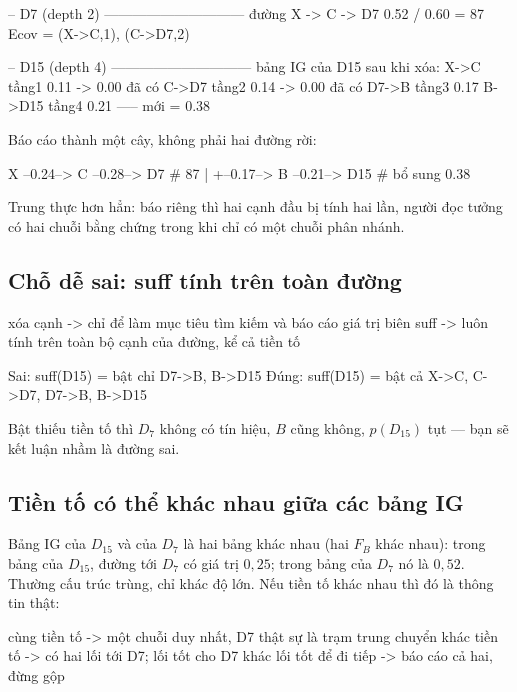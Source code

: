 \documentclass[11pt,a4paper]{article}
\begin{document}
\begin{dia}
-- D7  (depth 2) ------------------------------
đường X -> C -> D7            0.52 / 0.60 = 87%
Ecov = { (X->C,1), (C->D7,2) }

-- D15 (depth 4) ------------------------------
bảng IG của D15 sau khi xóa:
    X->C    tầng1   0.11 -> 0.00   đã có
    C->D7   tầng2   0.14 -> 0.00   đã có
    D7->B   tầng3   0.17
    B->D15  tầng4   0.21
                    ----- mới = 0.38
\end{dia}

Báo cáo thành một cây, không phải hai đường rời:

\begin{dia}
X --0.24--> C --0.28--> D7 #          87%
                        |
                        +--0.17--> B --0.21--> D15 #     bổ sung 0.38
\end{dia}

Trung thực hơn hẳn: báo riêng thì hai cạnh đầu bị tính hai lần, người đọc tưởng có hai chuỗi bằng chứng trong khi chỉ có một chuỗi phân nhánh.

\subsection{Chỗ dễ sai: suff tính trên toàn đường}

\begin{dia}
xóa cạnh  ->  chỉ để làm mục tiêu tìm kiếm và báo cáo giá trị biên
suff      ->  luôn tính trên toàn bộ cạnh của đường, kể cả tiền tố

Sai:   suff(D15) = bật chỉ { D7->B, B->D15 }
Đúng:  suff(D15) = bật cả  { X->C, C->D7, D7->B, B->D15 }
\end{dia}

Bật thiếu tiền tố thì $D_7$ không có tín hiệu, $B$ cũng không, $p(D_{15})$ tụt --- bạn sẽ kết luận nhầm là đường sai.

\subsection{Tiền tố có thể khác nhau giữa các bảng IG}

Bảng IG của $D_{15}$ và của $D_7$ là hai bảng khác nhau (hai $F_B$ khác nhau): trong bảng của $D_{15}$, đường tới $D_7$ có giá trị $0{,}25$; trong bảng của $D_7$ nó là $0{,}52$. Thường cấu trúc trùng, chỉ khác độ lớn. Nếu tiền tố khác nhau thì đó là thông tin thật:

\begin{dia}
cùng tiền tố   ->  một chuỗi duy nhất, D7 thật sự là trạm trung chuyển
khác tiền tố   ->  có hai lối tới D7; lối tốt cho D7 khác lối tốt để đi tiếp
                   -> báo cáo cả hai, đừng gộp
\end{dia}
\end{document}
